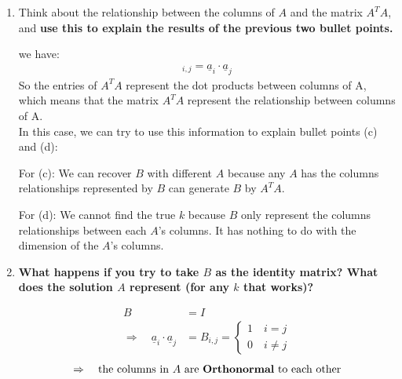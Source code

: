 \documentclass[11pt,letterpaper]{article}
\begin{document}
\begin{enumerate}
\begin{enumerate}
    \item 
    Think about the relationship between the columns of $A$ and the matrix $A^T A$, and
    \textbf{
     use this to explain the results of the previous two bullet points.
    }
    \begin{flushleft}
        \justifying
        we have:
        \begin{align*}
            [A^TA]_{i,j} = \underline a_i \cdot \underline a_j
        \end{align*}
        So the entries of $A^TA$ represent the dot products between columns of A, which means that the matrix $A^TA$ represent the relationship between columns of A.
        \\
        In this case, we can try to use this information to explain bullet points (c) and (d):
        \begin{flushleft}
            \justifying
            For (c): We can recover $B$ with different $A$ because any $A$ has the columns relationships represented by $B$ can generate $B$ by $A^TA$. 
        \end{flushleft}
        \begin{flushleft}
            \justifying
            For (d): We cannot find the true $k$ because $B$ only represent the columns relationships between each $A$'s columns. It has nothing to do with the dimension of the $A$'s columns.
        \end{flushleft}
        
    \end{flushleft}

    \item 
    \textbf{
    What happens if you try to take $B$ as the identity matrix? What does the solution $A$ represent (for any $k$ that works)?
    }
    

    
    \begin{align*}
        B &= I \\
        \Rightarrow \quad \underline a_i \cdot \underline a_j &= B_{i,j} = 
        \begin{cases}
             1 \quad i=j \\
             0 \quad i\not=j  
        \end{cases}
    \end{align*}
    \begin{align*}
        \Rightarrow \quad \text{the columns in $A$ are \textbf{Orthonormal} to each other}
    \end{align*}
    

\end{enumerate}
\end{enumerate}
\end{document}
